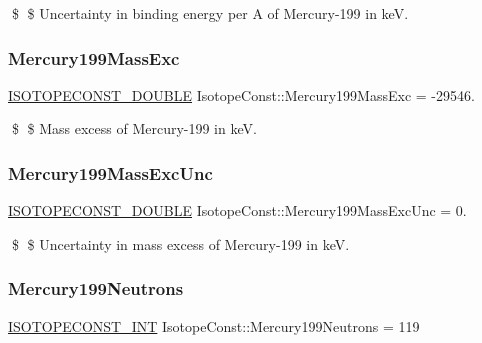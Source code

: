 \$ \$ Uncertainty in binding energy per A of Mercury-\/199 in keV. \mbox{\label{group___isotope_const-_mercury-_hg199_ga8f784d25d34b9f1fc2f3d14e9631c3cf}} 
\subsubsection{\texorpdfstring{Mercury199\+Mass\+Exc}{Mercury199MassExc}}
{\footnotesize\ttfamily \mbox{\hyperlink{group___isotope_const-_macros_ga8f45a7272ce02c0b4c65c44636ed719a}{I\+S\+O\+T\+O\+P\+E\+C\+O\+N\+S\+T\+\_\+\+D\+O\+U\+B\+LE}} Isotope\+Const\+::\+Mercury199\+Mass\+Exc = -\/29546.}

\$ \$ Mass excess of Mercury-\/199 in keV. \mbox{\label{group___isotope_const-_mercury-_hg199_gafe643b282ad9dbc46d3c6c48896c0aba}} 
\subsubsection{\texorpdfstring{Mercury199\+Mass\+Exc\+Unc}{Mercury199MassExcUnc}}
{\footnotesize\ttfamily \mbox{\hyperlink{group___isotope_const-_macros_ga8f45a7272ce02c0b4c65c44636ed719a}{I\+S\+O\+T\+O\+P\+E\+C\+O\+N\+S\+T\+\_\+\+D\+O\+U\+B\+LE}} Isotope\+Const\+::\+Mercury199\+Mass\+Exc\+Unc = 0.}

\$ \$ Uncertainty in mass excess of Mercury-\/199 in keV. \mbox{\label{group___isotope_const-_mercury-_hg199_gad2f0ef693e58580bc69c9c55aee9cfcc}} 
\subsubsection{\texorpdfstring{Mercury199\+Neutrons}{Mercury199Neutrons}}
{\footnotesize\ttfamily \mbox{\hyperlink{group___isotope_const-_macros_ga5f18360b3e99483a35c32d789e62621c}{I\+S\+O\+T\+O\+P\+E\+C\+O\+N\+S\+T\+\_\+\+I\+NT}} Isotope\+Const\+::\+Mercury199\+Neutrons = 119}

